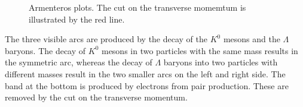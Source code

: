 \begin{figure}[!h]
  \centering
	\caption{Armenteros plots. The cut on the transverse momemtum is illustrated by the red line.}
	\label{pic:Armenteros}
\end{figure}

The three visible arcs are produced by the decay of the $K^0$ mesons and the $\Lambda$ baryons. The decay of $K^0$ mesons in two particles with the same mass results in the symmetric arc, whereas the decay of $\Lambda$ baryons into two particles with different masses result in the two smaller arcs on the left and right side. The band at the bottom is produced by electrons from pair production. These are removed by the cut on the transverse momentum.

